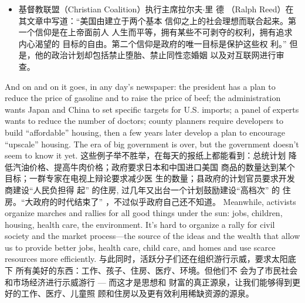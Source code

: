 \begin{paracol}{2}
\begin{itemize}
\end{itemize}
\switchcolumn
\begin{itemize}
	\item 基督教联盟（Christian Coalition）执行主席拉尔夫$\cdot$里
	德 （Ralph Reed）在其文章中写道：“美国由建立于两个基本
	信仰之上的社会理想而联合起来。第一个信仰是在上帝面前人
	人生而平等，拥有某些不可剥夺的权利，拥有追求内心渴望的
	目标的自由。第二个信仰是政府的唯一目标是保护这些权
	利。” 但是，他的政治计划却包括禁止堕胎、禁止同性恋婚姻
	以及对互联网进行审查。
\end{itemize}
\switchcolumn*
And on and on it goes, in any day's newspaper: the president
has a plan to reduce the price of gasoline and to raise the price
of beef; the administration wants Japan and China to set specific targets for U.S. imports; a panel of experts wants to reduce
the number of doctors; county planners require developers to
build ``affordable'' housing, then a few years later develop a plan
to encourage ``upscale'' housing. The era of big government is
over, but the government doesn't seem to know it yet.
\switchcolumn
这些例子举不胜举，在每天的报纸上都能看到：总统计划
降低汽油价格、提高牛肉价格；政府要求日本和中国进口美国
商品的数量达到某个目标；一群专家在电视上辩论要求减少医
生的数量；县政府的计划官员要求开发商建设“人民负担得
起” 的住房, 过几年又出台一个计划鼓励建设“高档次” 的
住房。“大政府的时代结束了” ，不过似乎政府自己还不知道。
\switchcolumn*
Meanwhile, activists organize marches and rallies for all good
things under the sun: jobs, children, housing, health care, the
environment. It's hard to organize a rally for civil society and
the market process---the source of the ideas and the wealth that
allow us to provide better jobs, health care, child care, and
homes and use scarce resources more efficiently.
\switchcolumn
与此同时，活跃分子们还在组织游行示威，要求太阳底下
所有美好的东西：工作、孩子、住房、医疗、环境。但他们不
会为了市民社会和市场经济进行示威游行 --- 而这才是思想和
财富的真正源泉，让我们能够得到更好的工作、医疗、儿童照
顾和住房以及更有效利用稀缺资源的源泉。


\end{paracol}
